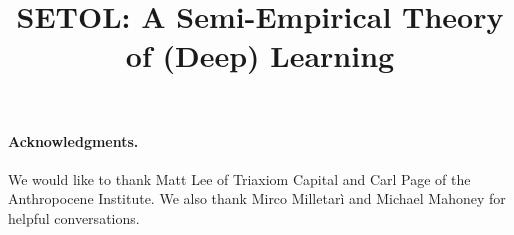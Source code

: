 \documentclass[]{interact} %
\begin{document}


\title{%
SETOL: A Semi-Empirical Theory of (Deep) Learning
}

\author{
}


\date{}
\maketitle

\begin{abstract}

\end{abstract}

\newpage
\tableofcontents


\newpage

\newpage

\newpage

\newpage

\newpage

\newpage

\newpage



\noindent
\paragraph{Acknowledgments.}
We would like to thank Matt Lee of Triaxiom Capital and Carl Page of the Anthropocene Institute.
We also thank Mirco Milletarì and Michael Mahoney for helpful conversations.



\appendix


\end{document}
